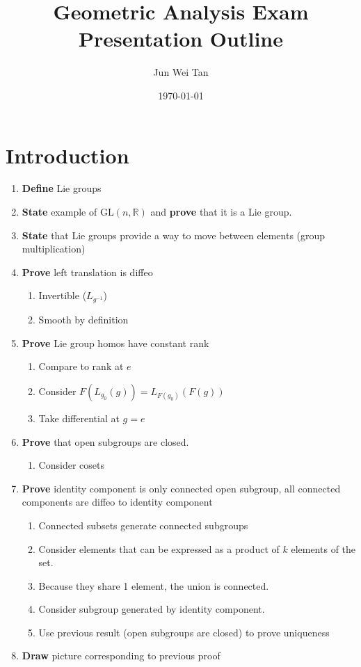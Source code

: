 \documentclass[prb,12pt]{revtex4-2}
\theoremstyle{definition}
\theoremstyle{definition}
\newcommand{\R}{\mathbb{R}}
\begin{document}
\title{Geometric Analysis Exam Presentation Outline}
	\author{Jun Wei Tan}
	\date{\today}
	\maketitle
\section{Introduction}
\begin{enumerate}
	\item \textbf{Define} Lie groups
	\item \textbf{State} example of $\text{GL}(n,\R)$ and \textbf{prove} that it is a Lie group.
	\item \textbf{State} that Lie groups provide a way to move between elements (group multiplication)
	\item \textbf{Prove} left translation is diffeo
	\begin{enumerate}
		\item Invertible ($L_{g^{-1}}$)
		\item Smooth by definition
	\end{enumerate}
	\item \textbf{Prove} Lie group homos have constant rank
		\begin{enumerate}
		\item Compare to rank at $e$
		\item Consider $F(L_{g_0}(g))=L_{F(g_0)}(F(g))$
		\item Take differential at $g=e$
	\end{enumerate}
	\item \textbf{Prove} that open subgroups are closed.
		\begin{enumerate}
		\item Consider cosets
	\end{enumerate}
	\item \textbf{Prove} identity component is only connected open subgroup, all connected components are diffeo to identity component
	\begin{enumerate}
		\item Connected subsets generate connected subgroups
		\item Consider elements that can be expressed as a product of $k$ elements of the set.
		\item Because they share 1 element, the union is connected.
		\item Consider subgroup generated by identity component.
		\item Use previous result (open subgroups are closed) to prove uniqueness
	\end{enumerate}
	\item \textbf{Draw} picture corresponding to previous proof
\end{enumerate}
\end{document}
